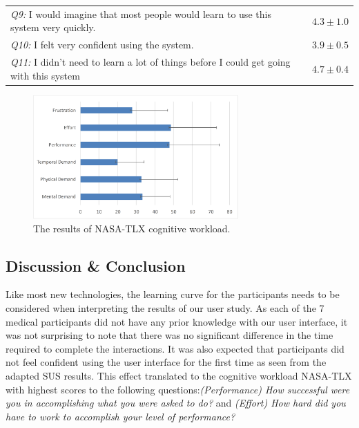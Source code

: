 {\begin{table}
\begin{center}
\begin{tabular}{p{8cm}|p{1.2cm}}
			\textit{Q9:} I would imagine that most people would learn to use this system very quickly. & $4.3\pm1.0$ \\
			\textit{Q10:} I felt very confident using the system. & $3.9\pm0.5$ \\
			\textit{Q11:} I didn't need to learn a lot of things before I could get going with this system & $4.7\pm0.4$
		\end{tabular}
	\end{center}
\end{table}
\begin{figure}
	\centering
	\includegraphics[width=0.7\textwidth]{figures/4-PointingOR/NASATLX.png}
	\caption{The results of NASA-TLX cognitive workload.}
	\label{fig:4-PointingOR:NASATLX}       %
\end{figure}

\subsection{Discussion \& Conclusion}%
Like most new technologies, the learning curve for the participants needs to be considered when interpreting the results of our user study. As each of the 7 medical participants did not have any prior knowledge with our user interface, it was not surprising to note that there was no significant difference in the time required to complete the interactions.  It was also expected that participants did not feel confident using the user interface for the first time as seen from the adapted SUS results. This effect translated to the cognitive workload NASA-TLX with highest scores to the following questions:\textit{(Performance) How successful were you in accomplishing what you were asked to do?} and \textit{(Effort) How hard did you have to work to accomplish your level of performance?}

}
